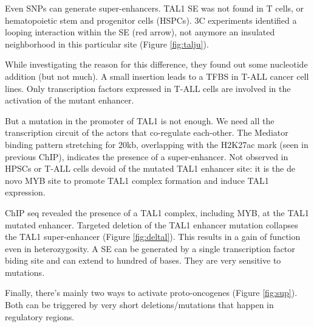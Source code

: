 Even SNPs can generate super-enhancers. TAL1 SE was not found in T cells, or hematopoietic stem and progenitor cells (HSPCs). 3C experiments identified a looping interaction within the SE (red arrow), not anymore an insulated neighborhood in this particular site (Figure \ref{fig:talju}).

While investigating the reason for this difference, they found out some nucleotide addition (but not much). A small insertion leads to a TFBS in T-ALL cancer cell lines. Only transcription factors expressed in T-ALL cells are involved in the activation of the mutant enhancer.

But a mutation in the promoter of TAL1 is not enough. We need all the transcription circuit of the actors that co-regulate each-other. The Mediator binding pattern stretching for 20kb, overlapping with the H2K27ac mark (seen in previous ChIP), indicates the presence of a super-enhancer. Not observed in HPSCs or T-ALL cells devoid of the mutated TAL1 enhancer site: it is the de novo MYB site to promote TAL1 complex formation and induce TAL1 expression.

ChIP seq revealed the presence of a TAL1 complex, including MYB, at the TAL1 mutated enhancer.
Targeted deletion of the TAL1 enhancer mutation collapses the TAL1 super-enhancer (Figure \ref{fig:deltal}). This results in a gain of function even in heterozygosity. A SE can be generated by a single transcription factor biding site and can extend to hundred of bases. They are very sensitive to mutations.

Finally, there's mainly two ways to activate proto-oncogenes (Figure \ref{fig:sup}). Both can be triggered by very short deletions/mutations that happen in regulatory regions.

